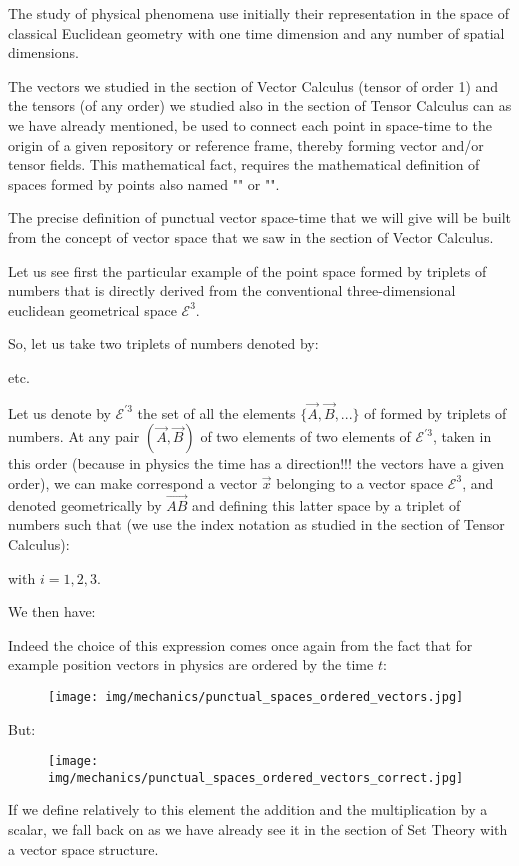 	The study of physical phenomena use initially their representation in the space of classical Euclidean geometry with one time dimension and any number of spatial dimensions.

	The vectors we studied in the section of Vector Calculus (tensor of order 1) and the tensors (of any order) we studied also in the section of Tensor Calculus can as we have already mentioned, be used to connect each point in space-time to the origin of a given repository or reference frame, thereby forming vector and/or tensor fields. This mathematical fact, requires the mathematical definition of spaces formed by points also named "" or "".
	
	The precise definition of punctual vector space-time that we will give will be built from the concept of vector space that we saw in the section of Vector Calculus.

	Let us see first the particular example of the point space formed by triplets of numbers that is directly derived from the conventional three-dimensional euclidean geometrical space $\mathcal{E}^3$.

	So, let us take two triplets of numbers denoted by:
	
	etc. 

	Let us denote by $\mathcal{E}^{'3}$ the set of all the elements $\{\vec{A}, \vec{B}, ...\}$ of formed by triplets of numbers. At any pair $(\vec{A}, \vec{B})$ of two elements of two elements of $\mathcal{E}^{'3}$, taken in this order (because in physics the time has a direction!!! the vectors have a given order), we can make correspond a vector $\vec{x}$ belonging to a vector space $\mathcal{E}^3$, and denoted geometrically by $\overrightarrow{AB}$ and defining this latter space by a triplet of numbers such that (we use the index notation as studied in the section of Tensor Calculus):
		
	with $i=1,2,3$.
	
	We then have:
	
	
	Indeed the choice of this expression comes once again from the fact that for example position vectors in physics are ordered by the time $t$:
	\begin{figure}[H]
		\centering
		\texttt{[image: img/mechanics/punctual\_spaces\_ordered\_vectors.jpg]}
	\end{figure}
	But:
	\begin{figure}[H]
		\centering
		\texttt{[image: img/mechanics/punctual\_spaces\_ordered\_vectors\_correct.jpg]}
	\end{figure}
	If we define relatively to this element the addition and the multiplication by a scalar, we fall back on as we have already see it in the section of Set Theory with a vector space structure.

